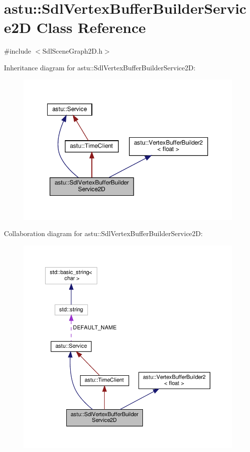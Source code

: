 \hypertarget{classastu_1_1SdlVertexBufferBuilderService2D}{}\section{astu\+:\+:Sdl\+Vertex\+Buffer\+Builder\+Service2D Class Reference}
\label{classastu_1_1SdlVertexBufferBuilderService2D}


{\ttfamily \#include $<$Sdl\+Scene\+Graph2\+D.\+h$>$}



Inheritance diagram for astu\+:\+:Sdl\+Vertex\+Buffer\+Builder\+Service2D\+:\nopagebreak
\begin{figure}[H]
\begin{center}
\leavevmode
\includegraphics[width=348pt]{classastu_1_1SdlVertexBufferBuilderService2D__inherit__graph}
\end{center}
\end{figure}


Collaboration diagram for astu\+:\+:Sdl\+Vertex\+Buffer\+Builder\+Service2D\+:\nopagebreak
\begin{figure}[H]
\begin{center}
\leavevmode
\includegraphics[width=350pt]{classastu_1_1SdlVertexBufferBuilderService2D__coll__graph}
\end{center}
\end{figure}
